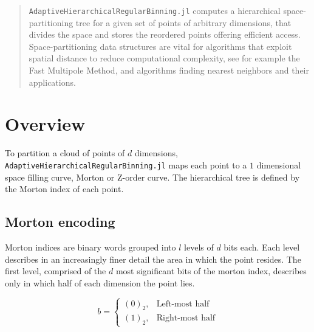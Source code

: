 \documentclass{juliacon}
\begin{document}


\maketitle

\begin{abstract}

\verb|AdaptiveHierarchicalRegularBinning.jl| computes a hierarchical space-partitioning
tree for a given set of points of arbitrary dimensions, that divides the space and
stores the reordered points offering efficient access. Space-partitioning data
structures are vital for algorithms that exploit spatial distance to reduce
computational complexity, see for example the Fast Multipole Method, and algorithms
finding nearest neighbors and their applications.

\end{abstract}

\section{Overview}
To partition a cloud of points of $d$ dimensions,
\verb|AdaptiveHierarchicalRegularBinning.jl| maps each point to a $1$ dimensional
space filling curve, Morton or Z-order curve. The hierarchical tree is defined by the
Morton index of each point.



\subsection{Morton encoding}
Morton indices are binary words grouped into $l$ levels of $d$ bits each. Each level
describes in an increasingly finer detail the area in which the point resides. The
first level, comprised of the $d$ most significant bits of the morton index, describes
only in which half of each dimension the point lies.

$$b = \left\{\begin{matrix}
  (0)_2, & \textrm{Left-most half}  \\
  (1)_2, & \textrm{Right-most half}
\end{matrix}\right.$$
\end{document}

